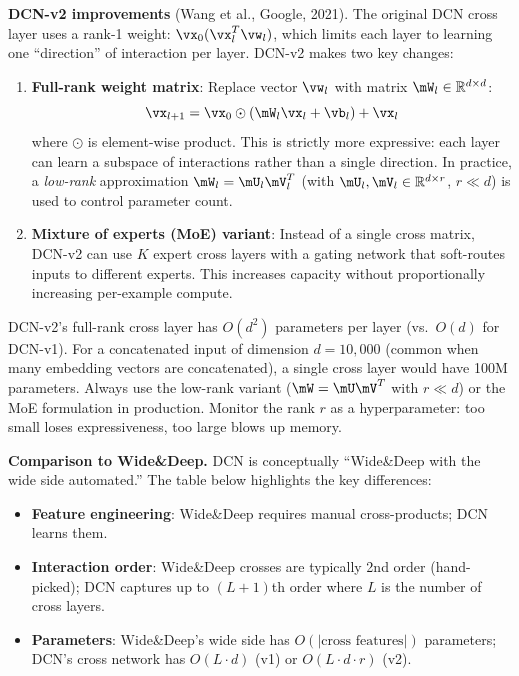 \textbf{DCN-v2 improvements} (Wang et al., Google, 2021). The original DCN cross layer uses a rank-1 weight: $\vx_0 (\vx_l^T \vw_l)$, which limits each layer to learning one ``direction'' of interaction per layer. DCN-v2 makes two key changes:
\begin{enumerate}
    \item \textbf{Full-rank weight matrix}: Replace vector $\vw_l$ with matrix $\mW_l \in \mathbb{R}^{d \times d}$:
    \begin{equation}
    \vx_{l+1} = \vx_0 \odot (\mW_l \vx_l + \vb_l) + \vx_l
    \end{equation}
    where $\odot$ is element-wise product. This is strictly more expressive: each layer can learn a subspace of interactions rather than a single direction. In practice, a \textit{low-rank} approximation $\mW_l = \mU_l \mV_l^T$ (with $\mU_l, \mV_l \in \mathbb{R}^{d \times r}$, $r \ll d$) is used to control parameter count.
    \item \textbf{Mixture of experts (MoE) variant}: Instead of a single cross matrix, DCN-v2 can use $K$ expert cross layers with a gating network that soft-routes inputs to different experts. This increases capacity without proportionally increasing per-example compute.
\end{enumerate}

\begin{warningbox}
DCN-v2's full-rank cross layer has $O(d^2)$ parameters per layer (vs.\ $O(d)$ for DCN-v1). For a concatenated input of dimension $d = 10{,}000$ (common when many embedding vectors are concatenated), a single cross layer would have 100M parameters. Always use the low-rank variant ($\mW = \mU \mV^T$ with $r \ll d$) or the MoE formulation in production. Monitor the rank $r$ as a hyperparameter: too small loses expressiveness, too large blows up memory.
\end{warningbox}

\textbf{Comparison to Wide\&Deep.} DCN is conceptually ``Wide\&Deep with the wide side automated.'' The table below highlights the key differences:
\begin{itemize}
    \item \textbf{Feature engineering}: Wide\&Deep requires manual cross-products; DCN learns them.
    \item \textbf{Interaction order}: Wide\&Deep crosses are typically 2nd order (hand-picked); DCN captures up to $(L+1)$th order where $L$ is the number of cross layers.
    \item \textbf{Parameters}: Wide\&Deep's wide side has $O(|\text{cross features}|)$ parameters; DCN's cross network has $O(L \cdot d)$ (v1) or $O(L \cdot d \cdot r)$ (v2).
\end{itemize}

